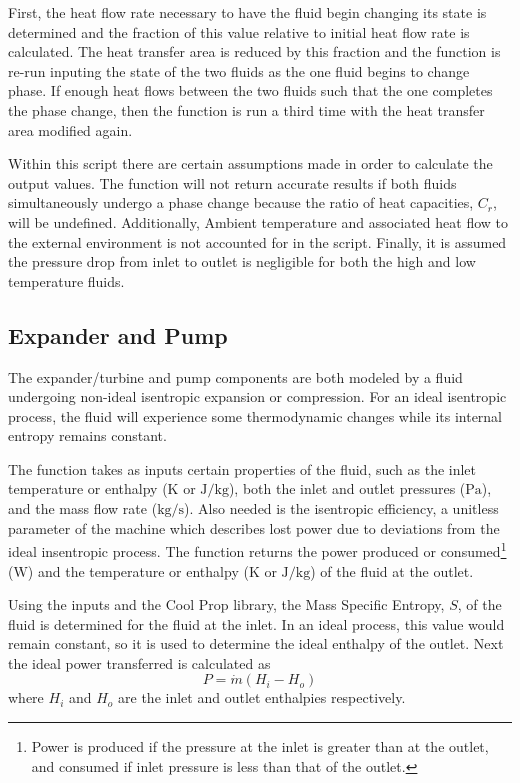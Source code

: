 First, the heat flow rate necessary to have the fluid begin changing its state is determined and the fraction of this value relative to initial heat flow rate is calculated. 
The heat transfer area is reduced by this fraction and the function is re-run inputing the state of the two fluids as the one fluid begins to change phase. If enough heat flows between the two fluids such that the one completes the phase change, then the function is run a third time with the heat transfer area modified again. 

Within this script there are certain assumptions made in order to calculate the output values. The function will not return accurate results if both fluids simultaneously undergo a phase change because the ratio of heat capacities, $C_r$, will be undefined. Additionally, Ambient temperature and associated heat flow to the external environment is not accounted for in the script. Finally, it is assumed the pressure drop from inlet to outlet is negligible for both the high and low temperature fluids. 

\subsection{Expander and Pump}
The expander/turbine and pump components are both modeled by a fluid undergoing non-ideal isentropic expansion or compression. For an ideal isentropic process, the fluid will experience some thermodynamic changes while its internal entropy remains constant. 

The function takes as inputs certain properties of the fluid, such as the inlet temperature or enthalpy ($\si{\kelvin}$ or $\si{\joule\per\kilogram}$), both the inlet and outlet pressures ($\si{\pascal}$), and the mass flow rate ($\si{\kilogram\per\second}$). Also needed is the isentropic efficiency, a unitless parameter of the machine which describes lost power due to deviations from the ideal insentropic process. The function returns the power produced or consumed\footnote{Power is produced if the pressure at the inlet is greater than at the outlet, and consumed if inlet pressure is less than that of the outlet.} ($\si{\watt}$) and the temperature or enthalpy ($\si{\kelvin}$ or $\si{\joule\per\kilogram}$) of the fluid at the outlet.

Using the inputs and the Cool Prop library, the Mass Specific Entropy, $S$, of the fluid is determined for the fluid at the inlet. In an ideal process, this value would remain constant, so it is used to determine the ideal enthalpy of the outlet. Next the ideal power transferred is calculated as 
\begin{equation}
\label{eq:power_enthalpy}
P = \dot{m} \left(H_i - H_o\right)
\end{equation}
where $H_i$ and $H_o$ are the inlet and outlet enthalpies respectively.

